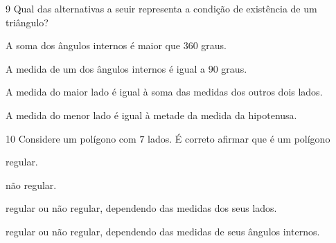 
\num{9}  Qual das alternativas a seuir representa a condição de existência de
um triângulo?

\begin{escolha}
\item A soma dos ângulos internos é maior que $360$ graus. 
\item A medida de um
dos ângulos internos é igual a $90$ graus. 
\item A medida do maior lado é
igual à soma das medidas dos outros dois lados. 
\item A medida do menor
lado é igual à metade da medida da hipotenusa.
\end{escolha}



\num{10} Considere um polígono com $7$ lados. É correto afirmar que é
um polígono

\begin{escolha}
\item regular.
\item não regular.
\item regular ou não regular, dependendo das medidas dos seus lados.
\item regular ou não regular, dependendo das medidas de seus ângulos internos.
\end{escolha}

